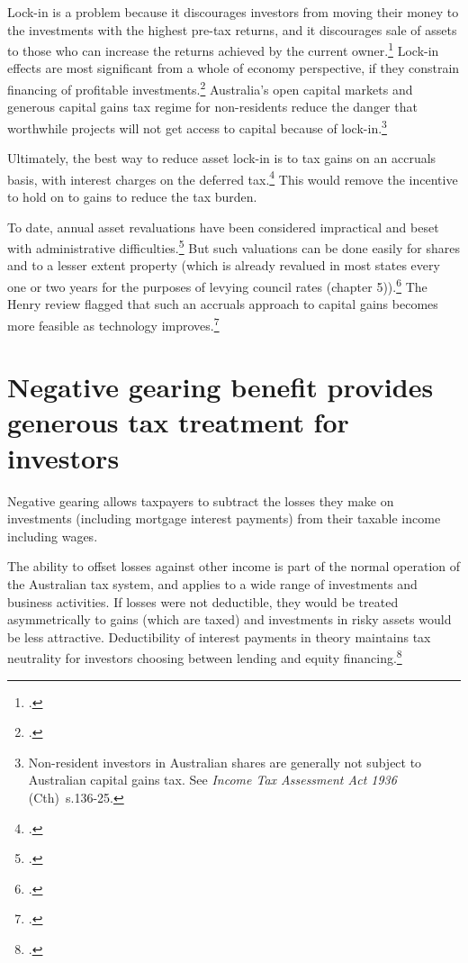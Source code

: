 \documentclass{grattan}\usepackage[]{graphicx}\usepackage[]{color}
\newcommand{\Act}[2]{\emph{#1} (#2)}
\begin{document}
Lock-in is a problem because it discourages investors from moving their money to the investments with the highest pre-tax returns, and it discourages sale of assets to those who can increase the returns achieved by the current owner.\footcite{Lindsey1987}  Lock-in effects are most significant from a whole of economy perspective, if they constrain financing of profitable investments.\footcites{OECD2006b}{Johnson2008}  Australia's open capital markets and generous capital gains tax regime for non-residents reduce the danger that worthwhile projects will not get access to capital because of lock-in.\footnote{Non-resident investors in Australian shares are generally not subject to Australian capital gains tax. See \Act{Income Tax Assessment Act 1936}{Cth}~s.136-25.}  

Ultimately, the best way to reduce asset lock-in is to tax gains on an accruals basis, with interest charges on the deferred tax.\footcite[pp.~11-14]{Burman2009} This would remove the incentive to hold on to gains to reduce the tax burden. 

To date, annual asset revaluations have been considered impractical and beset with administrative difficulties.\footcites{OECD2006a}{Commission2004} But such valuations can be done easily for shares and to a lesser extent property (which is already revalued in most states every one or two years for the purposes of levying council rates (chapter 5)).\footcites{Burman2009}[p.~12]{Ingles2009} The Henry review flagged that such an accruals approach to capital gains becomes more feasible as technology improves.\footcite[p.~64]{Treasury2010} 


\section{Negative gearing benefit provides generous tax treatment for investors}\label{sec:negative_gearing_provides}
Negative gearing allows taxpayers to subtract the losses they make on investments (including mortgage interest payments) from their taxable income including wages. 

The ability to offset losses against other income is part of the normal operation of the Australian tax system, and applies to a wide range of investments and business activities. If losses were not deductible, they would be treated asymmetrically to gains (which are taxed) and investments in risky assets would be less attractive. Deductibility of interest payments in theory maintains tax neutrality for investors choosing between lending and equity financing.\footcite{Fane2004}  
\end{document}
